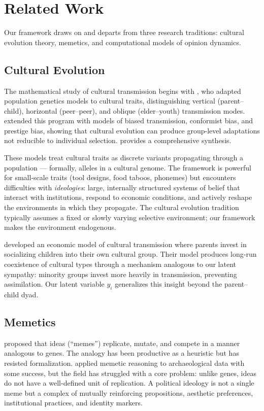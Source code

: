 \section{Related Work}
\label{sec:related}

Our framework draws on and departs from three research traditions: cultural
evolution theory, memetics, and computational models of opinion dynamics.

\subsection{Cultural Evolution}

The mathematical study of cultural transmission begins with
\citet{cavalli1981cultural}, who adapted population genetics models to
cultural traits, distinguishing vertical (parent--child), horizontal
(peer--peer), and oblique (elder--youth) transmission modes.
\citet{boyd2005origin} extended this program with models of biased
transmission, conformist bias, and prestige bias, showing that cultural
evolution can produce group-level adaptations not reducible to individual
selection. \citet{mesoudi2011cultural} provides a comprehensive synthesis.

These models treat cultural traits as discrete variants propagating through
a population --- formally, alleles in a cultural genome. The framework is
powerful for small-scale traits (tool designs, food taboos, phonemes) but
encounters difficulties with \emph{ideologies}: large, internally structured
systems of belief that interact with institutions, respond to economic
conditions, and actively reshape the environments in which they propagate.
The cultural evolution tradition typically assumes a fixed or slowly varying
selective environment; our framework makes the environment endogenous.

\citet{bisin2001economics} developed an economic model of cultural
transmission where parents invest in socializing children into their own
cultural group. Their model produces long-run coexistence of cultural types
through a mechanism analogous to our latent sympathy: minority groups invest
more heavily in transmission, preventing assimilation. Our latent variable
$y_i$ generalizes this insight beyond the parent--child dyad.

\subsection{Memetics}

\citet{dawkins1976selfish} proposed that ideas (``memes'') replicate, mutate,
and compete in a manner analogous to genes. The analogy has been productive
as a heuristic but has resisted formalization. \citet{shennan2002genes}
applied memetic reasoning to archaeological data with some success, but the
field has struggled with a core problem: unlike genes, ideas do not have a
well-defined unit of replication. A political ideology is not a single meme
but a complex of mutually reinforcing propositions, aesthetic preferences,
institutional practices, and identity markers.

